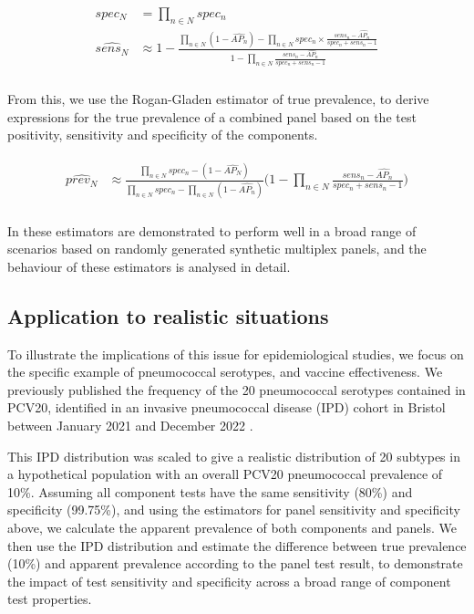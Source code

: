 \documentclass[10pt,letterpaper]{article}
\begin{document}
\begin{eqnarray}
\label{eq:schemeP1}
\begin{aligned}
spec_N &= \prod_{n \in N}{spec_n} \\
\widehat{sens_N} &\approx 1-\frac{
  \prod_{n \in N}{(1-\widehat{AP_n})} - \prod_{n \in N}{spec_n \times \frac{sens_n-\widehat{AP_n}}{spec_n + sens_n - 1}}
}{
  1 - \prod_{n \in N}{ \frac{sens_n-\widehat{AP_n}}{spec_n + sens_n - 1} }
} \\
\end{aligned}
\end{eqnarray}

From this, we use the Rogan-Gladen estimator of true prevalence\cite{rogan1978}, to derive expressions for the true prevalence of a combined panel based on the test positivity, sensitivity and specificity of the components.

\begin{eqnarray}
\label{eq:schemeP2}
\begin{aligned}
\widehat{prev_{N}} &\approx \frac{
    \prod_{n \in N}{spec_n} -(1-\widehat{AP_{N}})
  }{
    \prod_{n \in N}{spec_n}
    -\prod_{n \in N}{(1-\widehat{AP_n})}
  } \bigg(1 - \prod_{n \in N}{ \frac{sens_n-\widehat{AP_n}}{spec_n + sens_n - 1} } \bigg ) \\
\end{aligned}
\end{eqnarray}

In  these estimators are demonstrated to perform well in a broad range of scenarios based on randomly generated synthetic multiplex panels, and the behaviour of these estimators is analysed in detail.

\subsection*{Application to realistic situations}

To illustrate the implications of this issue for epidemiological studies, we focus on the specific example of pneumococcal serotypes, and vaccine effectiveness. We previously published the frequency of the 20 pneumococcal serotypes contained in PCV20, identified in an invasive pneumococcal disease (IPD) cohort in Bristol between January 2021 and December 2022 \cite{hyams2023a}.

This IPD distribution was scaled to give a realistic distribution of 20 subtypes in a hypothetical population with an overall PCV20 pneumococcal prevalence of 10\%. Assuming all component tests have the same sensitivity (80\%) and specificity (99.75\%), and using the estimators for panel sensitivity and specificity above, we calculate the apparent prevalence of both components and panels. We then use the IPD distribution and estimate the difference between true prevalence (10\%) and apparent prevalence according to the panel test result, to demonstrate the impact of test sensitivity and specificity across a broad range of component test properties. 
\end{document}

